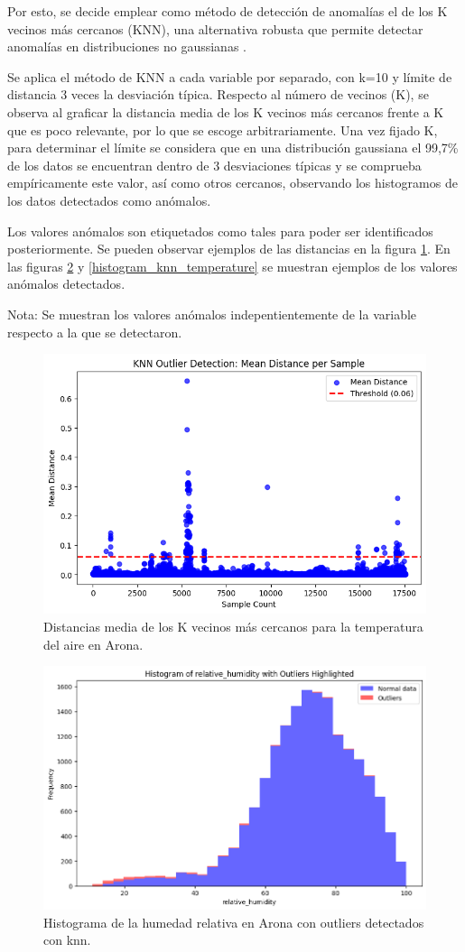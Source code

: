 Por esto, se decide emplear como método de detección de anomalías el de los K vecinos más cercanos (KNN), 
una alternativa robusta que permite detectar anomalías en distribuciones no gaussianas \cite{gu2019}.

Se aplica el método de KNN a cada variable por separado, con k=10 y límite de distancia 3 veces la desviación típica.
Respecto al número de vecinos (K), se observa al graficar la distancia media de los K vecinos más cercanos frente a K que es poco relevante, por lo que se escoge arbitrariamente.
Una vez fijado K, para determinar el límite se considera que en una distribución gaussiana el 99,7\% de los datos se encuentran dentro de 3 desviaciones típicas y se comprueba empíricamente
este valor, así como otros cercanos, observando los histogramos de los datos detectados como anómalos.

Los valores anómalos son etiquetados como tales para poder ser identificados posteriormente. Se pueden observar ejemplos 
de las distancias en la figura \ref{knn_distances}. En las figuras \ref{histogram_knn_humidity} y \ref{histogram_knn_temperature} se muestran ejemplos de los valores anómalos detectados. 

Nota: Se muestran los valores anómalos indepentientemente de la variable respecto a la que se detectaron.

\begin{figure}
    \centering
    \includegraphics[width=.5\linewidth]{images/knn_distances_temperature_arona.png}
    \caption{Distancias media de los K vecinos más cercanos para la temperatura del aire en Arona.}
    \label{knn_distances}
\end{figure}

\begin{figure}
    \centering
    \includegraphics[width=.5\linewidth]{images/histogram_humidity_knn.png}
    \caption{Histograma de la humedad relativa en Arona con outliers detectados con knn.}
    \label{histogram_knn_humidity}
\end{figure}

